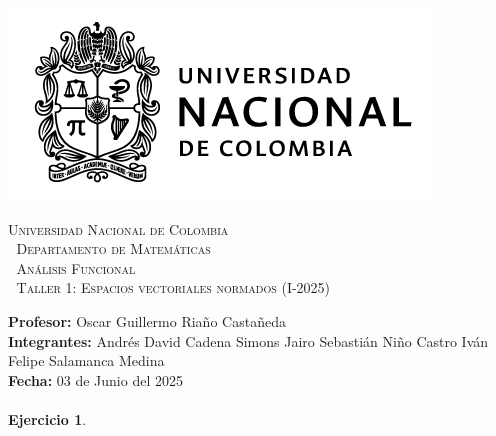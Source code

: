 \thispagestyle{empty}

\begin{minipage}{0.3\textwidth}
  \includegraphics[scale=0.35]{logounal.png}
\end{minipage}%
\hfill
\begin{minipage}{0.65\textwidth}
  \begin{center}
    \scshape
    \Large \textsc{Universidad Nacional de Colombia} \\
    \textcolor{white}{\tiny.} \Large \textsc{Departamento de Matemáticas} \\
    \textcolor{white}{\tiny.} \large \textsc{Análisis Funcional} \\
    \textcolor{white}{\tiny.} \large \textsf{Taller 1: Espacios vectoriales normados} \normalsize (I-2025)
  \end{center}
\end{minipage}

\vspace{0.3cm}
\normalfont

\textbf{Profesor:} Oscar Guillermo Riaño Castañeda\\
\textbf{Integrantes:} Andrés David Cadena Simons \hspace{2.8cm}  Jairo Sebastián Niño Castro\hspace{2.8cm}
Iván Felipe Salamanca Medina\\
\hspace*{2.1cm}\hspace{2.25cm}\textbf{Fecha:} 03 de Junio del 2025\\
\vspace{0.25cm}\\


\textbf{Ejercicio 1}.

